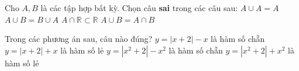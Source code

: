 \begin{ex}%
Cho $A, B$ là các tập hợp bất kỳ. Chọn câu \textbf{sai} trong các câu sau:
	\choice
	{$A \cup A = A$}
	{$A \cup B = B \cup A$}
	{$A \cap \mathbb{R} \subset \mathbb{R}$}
	{\True $A \cup B = A \cap B$}
\end{ex}

\begin{ex}%
Trong các phương án sau, câu nào đúng?
	\choice
	{$y = \left|x + 2\right| - x$ là hàm số chẵn}
	{$y = \left|x + 2\right| + x$ là hàm số lẻ}
	{\True $y = \left|x^2 + 2\right| - x^2$ là hàm số chẵn}
	{$y = \left|x^2 + 2\right| + x^2$ là hàm số lẻ}
\end{ex}


